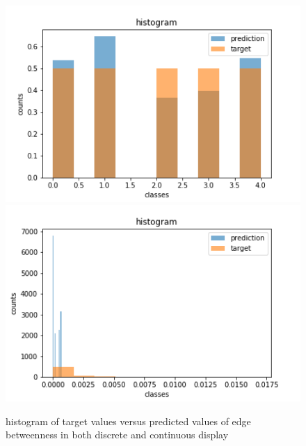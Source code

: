 \begin{figure}[H]
%
  \centering
    \includegraphics[width=0.9\linewidth]{img/GN_exp1/2019-09-28_22-02-08_META1_d4=19_d5=16_hus=10_eus=19_n1us=16_n2us=15_r=100_epochs=20_split-300-4000-10556-_histogram.png}
\endminipage
{}%
  \centering
    \includegraphics[width=0.9\linewidth]{img/GN_exp1/2019-09-28_22-02-08_META1_d4=19_d5=16_hus=10_eus=19_n1us=16_n2us=15_r=100_epochs=20_split-300-4000-10556-_histogram_real_eb.png}
\endminipage
\caption{histogram of target values versus predicted values of edge betweenness in both discrete and continuous display }\label{fig:edgeb_exp1_histogra}
\end{figure}



